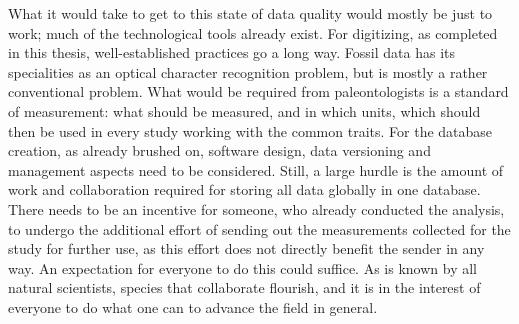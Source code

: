 \documentclass{article}
\begin{document}
What it would take to get to this state of data quality would mostly be just to work; much of the technological tools already exist. For digitizing, as completed in this thesis, well-established practices go a long way. Fossil data has its specialities as an optical character recognition problem, but is mostly a rather conventional problem.
What would be required from paleontologists is a standard of measurement: what should be measured, and in which units, which should then be used in every study working with the common traits. For the database creation, as already brushed on, software design, data versioning and management aspects need to be considered. Still, a large hurdle is the amount of work and collaboration required for storing all data globally in one database. There needs to be an incentive for someone, who already conducted the analysis, to undergo the additional effort of sending out the measurements collected for the study for further use, as this effort does not directly benefit the sender in any way. An expectation for everyone to do this could suffice. As is known by all natural scientists, species that collaborate flourish, and it is in the interest of everyone to do what one can to advance the field in general.

\printbibliography
\end{document}
